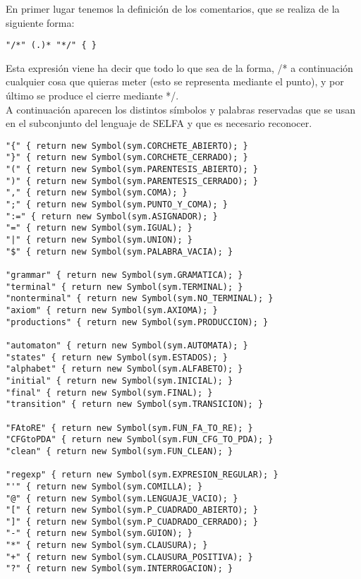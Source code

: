 \documentclass{llncs}
\begin{document}
En primer lugar tenemos la definición de los comentarios, que se realiza de la siguiente forma:

\begin{verbatim}
"/*" (.)* "*/" { }
\end{verbatim}

Esta expresión viene ha decir que todo lo que sea de la forma, /* a continuación cualquier cosa que quieras meter (esto
se representa mediante el punto), y por último se produce el cierre mediante */.\\

A continuación aparecen los distintos símbolos y palabras reservadas que se usan en el subconjunto del lenguaje de SELFA y que es necesario reconocer.

\begin{verbatim}
"{" { return new Symbol(sym.CORCHETE_ABIERTO); }
"}" { return new Symbol(sym.CORCHETE_CERRADO); }
"(" { return new Symbol(sym.PARENTESIS_ABIERTO); }
")" { return new Symbol(sym.PARENTESIS_CERRADO); }
"," { return new Symbol(sym.COMA); }
";" { return new Symbol(sym.PUNTO_Y_COMA); }
":=" { return new Symbol(sym.ASIGNADOR); }
"=" { return new Symbol(sym.IGUAL); }
"|" { return new Symbol(sym.UNION); }
"$" { return new Symbol(sym.PALABRA_VACIA); }

"grammar" { return new Symbol(sym.GRAMATICA); }
"terminal" { return new Symbol(sym.TERMINAL); }
"nonterminal" { return new Symbol(sym.NO_TERMINAL); }
"axiom" { return new Symbol(sym.AXIOMA); }
"productions" { return new Symbol(sym.PRODUCCION); }

"automaton" { return new Symbol(sym.AUTOMATA); }
"states" { return new Symbol(sym.ESTADOS); }
"alphabet" { return new Symbol(sym.ALFABETO); }
"initial" { return new Symbol(sym.INICIAL); }
"final" { return new Symbol(sym.FINAL); }
"transition" { return new Symbol(sym.TRANSICION); }

"FAtoRE" { return new Symbol(sym.FUN_FA_TO_RE); }
"CFGtoPDA" { return new Symbol(sym.FUN_CFG_TO_PDA); }
"clean" { return new Symbol(sym.FUN_CLEAN); }

"regexp" { return new Symbol(sym.EXPRESION_REGULAR); }
"'" { return new Symbol(sym.COMILLA); }
"@" { return new Symbol(sym.LENGUAJE_VACIO); }
"[" { return new Symbol(sym.P_CUADRADO_ABIERTO); }
"]" { return new Symbol(sym.P_CUADRADO_CERRADO); }
"-" { return new Symbol(sym.GUION); }
"*" { return new Symbol(sym.CLAUSURA); }
"+" { return new Symbol(sym.CLAUSURA_POSITIVA); }
"?" { return new Symbol(sym.INTERROGACION); }


\end{verbatim}
\end{document}
